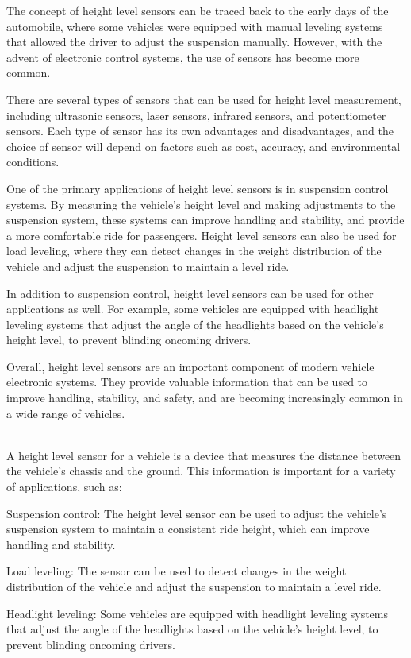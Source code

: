 \documentclass[11pt]{article}
\begin{document}
The concept of height level sensors can be traced back to the early days of the automobile, where some vehicles were equipped with manual leveling systems that allowed the driver to adjust the suspension manually. However, with the advent of electronic control systems, the use of sensors has become more common.

There are several types of sensors that can be used for height level measurement, including ultrasonic sensors, laser sensors, infrared sensors, and potentiometer sensors. Each type of sensor has its own advantages and disadvantages, and the choice of sensor will depend on factors such as cost, accuracy, and environmental conditions.

One of the primary applications of height level sensors is in suspension control systems. By measuring the vehicle's height level and making adjustments to the suspension system, these systems can improve handling and stability, and provide a more comfortable ride for passengers. Height level sensors can also be used for load leveling, where they can detect changes in the weight distribution of the vehicle and adjust the suspension to maintain a level ride.

In addition to suspension control, height level sensors can be used for other applications as well. For example, some vehicles are equipped with headlight leveling systems that adjust the angle of the headlights based on the vehicle's height level, to prevent blinding oncoming drivers.

Overall, height level sensors are an important component of modern vehicle electronic systems. They provide valuable information that can be used to improve handling, stability, and safety, and are becoming increasingly common in a wide range of vehicles.

\indent \\A height level sensor for a vehicle is a device that measures the distance between the vehicle's chassis and the ground. This information is important for a variety of applications, such as:

Suspension control: The height level sensor can be used to adjust the vehicle's suspension system to maintain a consistent ride height, which can improve handling and stability.

Load leveling: The sensor can be used to detect changes in the weight distribution of the vehicle and adjust the suspension to maintain a level ride.

Headlight leveling: Some vehicles are equipped with headlight leveling systems that adjust the angle of the headlights based on the vehicle's height level, to prevent blinding oncoming drivers.
\end{document}
